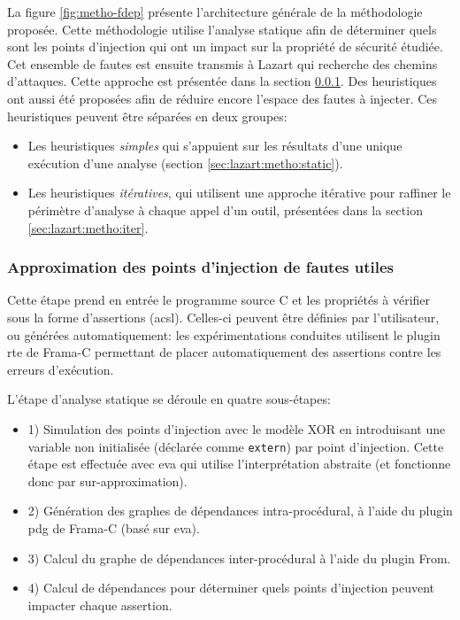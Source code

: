                 La figure \ref{fig:metho-fdep} présente l'architecture générale de la méthodologie proposée.
                Cette méthodologie utilise l'analyse statique afin de déterminer quels sont les points d'injection qui ont un impact sur la propriété de sécurité étudiée.
                Cet ensemble de fautes est ensuite transmis à Lazart qui recherche des chemins d'attaques.
                Cette approche est présentée dans la section \ref{sec:lazart:metho:eva}.
                Des heuristiques ont aussi été proposées afin de réduire encore l'espace des fautes à injecter. Ces heuristiques peuvent être séparées en deux groupes:
                \begin{itemize}
                    \item Les heuristiques \textit{simples} qui s'appuient sur les résultats d'une unique exécution d'une analyse (section \ref{sec:lazart:metho:static}).
                    \item Les heuristiques \textit{itératives}, qui utilisent une approche itérative pour raffiner le périmètre d'analyse à chaque appel d'un outil, présentées dans la section \ref{sec:lazart:metho:iter}.
                \end{itemize}
                
            \subsubsection{Approximation des points d'injection de fautes utiles}
            \label{sec:lazart:metho:eva}
            
                Cette étape prend en entrée le programme source C et les propriétés à vérifier sous la forme d'assertions (\gls{acsl}). Celles-ci peuvent être définies par l'utilisateur, ou générées automatiquement: les expérimentations conduites utilisent le plugin \gls{rte} de Frama-C permettant de placer automatiquement des assertions contre les erreurs d'exécution.
            
                L'étape d'analyse statique se déroule en quatre sous-étapes:
                \begin{itemize}
                    \item 1) Simulation des points d'injection avec le modèle XOR en introduisant une variable non initialisée (déclarée comme \texttt{extern}) par point d'injection. Cette étape est effectuée avec \gls{eva} qui utilise l'interprétation abstraite (et fonctionne donc par sur-approximation).
                    \item 2) Génération des graphes de dépendances intra-procédural, à l'aide du plugin \gls{pdg} de Frama-C (basé sur \gls{eva}).
                    \item 3) Calcul du graphe de dépendances inter-procédural à l'aide du plugin From.
                    \item 4) Calcul de dépendances pour déterminer quels points d'injection peuvent impacter chaque assertion.
                \end{itemize}
                

